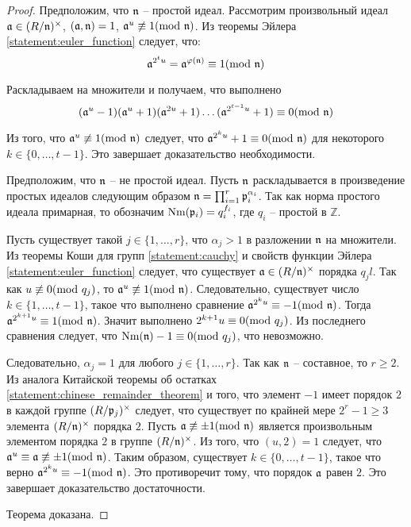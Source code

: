 \documentclass[_dissertation.tex]{subfiles}
\begin{document}
\begin{proof}
    Предположим, что $\mathfrak{n}$ -- простой идеал.
    Рассмотрим произвольный идеал $\mathfrak{a} \in (R/\mathfrak{n})^{\times}$, $(\mathfrak{a}, \mathfrak{n}) = 1$, $\mathfrak{a}^u \not\equiv 1(\textrm{mod } \mathfrak{n})$.
    Из теоремы Эйлера \ref{statement:euler_function} следует, что:
    \begin{equation*}
        \mathfrak{a}^{2^{t} u} = \mathfrak{a}^{\varphi(\mathfrak{n})} \equiv 1 (\textrm{mod } \mathfrak{n})
    \end{equation*}

    Раскладываем на множители и получаем, что выполнено
    \begin{equation*}
        (\mathfrak{a}^{u} - 1)(\mathfrak{a}^{u} + 1)(\mathfrak{a}^{2u} + 1)\dots(\mathfrak{a}^{2^{t-1}u} + 1) \equiv 0 (\textrm{mod } \mathfrak{n})
    \end{equation*}

    Из того, что $\mathfrak{a}^{u} \not\equiv 1 (\textrm{mod } \mathfrak{n})$ следует, что $\mathfrak{a}^{2^{k}u} + 1 \equiv 0 (\textrm{mod } \mathfrak{n})$ для некоторого $k\in \{0, \dots, t-1\}$.
    Это завершает доказательство необходимости.

    Предположим, что $\mathfrak{n}$ -- не простой идеал.
    Пусть $\mathfrak{n}$ раскладывается в произведение простых идеалов следующим образом $\mathfrak{n} = \prod_{i=1}^{r} \mathfrak{p}_i^{\alpha_i}$.
    Так как норма простого идеала примарная, то обозначим $\textrm{Nm}(\mathfrak{p}_i) = q_i^{f_i}$, где $q_i$ -- простой в $\mathbb{Z}$.

    Пусть существует такой $j \in \{1, \dots, r\}$, что $\alpha_j > 1$ в разложении $\mathfrak{n}$ на множители.
    Из теоремы Коши для групп \ref{statement:cauchy} и свойств функции Эйлера \ref{statement:euler_function} следует, что существует $\mathfrak{a} \in (R/\mathfrak{n})^{\times}$ порядка $q_j l$.
    Так как $u \not\equiv 0 (\textrm{mod } q_j)$, то $\mathfrak{a}^u \not\equiv 1 (\textrm{mod } \mathfrak{n})$.
    Следовательно, существует число $k \in \{1, \dots, t-1\}$, такое что выполнено сравнение $\mathfrak{a}^{2^{k}u} \equiv -1(\textrm{mod } \mathfrak{n})$.
    Тогда $\mathfrak{a}^{2^{k+1}u} \equiv 1(\textrm{mod } \mathfrak{n})$.
    Значит выполнено $2^{k+1}u \equiv 0 (\textrm{mod } q_j)$.
    Из последнего сравнения следует, что $\textrm{Nm}(\mathfrak{n}) - 1 \equiv 0(\textrm{mod } q_j)$, что невозможно.
    
    Следовательно, $\alpha_j = 1$ для любого $j \in \{1, \ldots, r\}$.
    Так как $\mathfrak{n}$ -- составное, то $r \ge 2$.
    Из аналога Китайской теоремы об остатках \ref{statement:chinese_remainder_theorem} и того, что элемент $-1$ имеет порядок $2$ в каждой группе $(R/\mathfrak{p}_j)^{\times}$ следует, что существует по крайней мере $2^r-1 \ge 3$ элемента $(R/\mathfrak{n})^{\times}$ порядка $2$.
    Пусть $\mathfrak{a} \not\equiv \pm 1(\textrm{mod } \mathfrak{n})$ является произвольным элементом порядка $2$ в группе $(R/\mathfrak{n})^{\times}$.
    Из того, что $(u, 2) = 1$ следует, что $\mathfrak{a}^u \equiv \mathfrak{a} \not\equiv \pm 1(\textrm{mod } \mathfrak{n})$.
    Таким образом, существует $k \in \{0,\ldots, t-1\}$, такое что верно $\mathfrak{a}^{2^{k}u} \equiv -1(\textrm{mod } \mathfrak{n})$.
    Это противоречит тому, что порядок $\mathfrak{a}$ равен $2$.
    Это завершает доказательство достаточности.

    Теорема доказана.
\end{proof}
\end{document}
